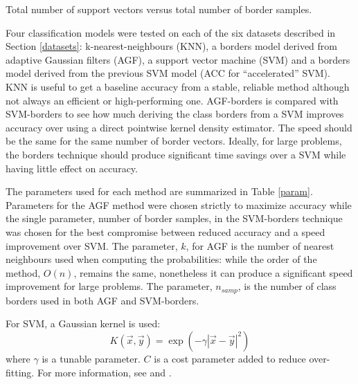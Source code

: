 \documentclass[11pt]{article}
\begin{document}
\begin{table}
	
	\caption{Total number of support vectors versus total number of border samples.}
\end{table}

Four classification models were tested on each of the six datasets described in
Section \ref{datasets}: k-nearest-neighbours (KNN), a borders model derived from
adaptive Gaussian filters (AGF), a support vector machine (SVM) and a borders
model derived from the previous SVM model (ACC for ``accelerated'' SVM).
KNN is useful to get a baseline accuracy from a stable, reliable method although
not always an efficient or high-performing one.
AGF-borders is compared with SVM-borders to see how much deriving the class borders
from a SVM improves accuracy over using a direct pointwise kernel density estimator.
The speed should be the same for the same number of border vectors.
Ideally, for large problems, the borders technique should produce significant time
savings over a SVM while having little effect on accuracy.

The parameters used for each method are summarized in Table \ref{param}.
Parameters for the AGF method were chosen strictly to maximize accuracy while
the single parameter, number of border samples, in the SVM-borders technique
was chosen for the best compromise between reduced accuracy and a speed
improvement over SVM. The parameter, $k$, for AGF is the number of nearest
neighbours used when computing the probabilities: 
while the order of the method, $O(n)$, remains the same, nonetheless it can produce a significant speed improvement for large problems.
The parameter, $n_{samp}$, is the number of class borders used in both 
AGF and SVM-borders.

For SVM, a Gaussian kernel is used:
\begin{equation}
	K(\vec x, \vec y) = \exp \left ( -\gamma | \vec x - \vec y |^2 \right )
\end{equation}
where $\gamma$ is a tunable parameter. 
$C$ is a cost parameter added to reduce over-fitting.
For more information, see \citet{Chang_Lin2011} and \citet{kernel_intro}.


\end{document}
